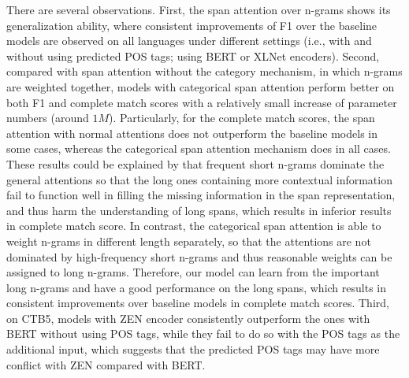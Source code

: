 \documentclass[11pt,a4paper]{article}
\begin{document}
There are several observations.
First, the span attention over n-grams shows its generalization ability, where 
consistent improvements of F1 over the baseline models are observed on all languages under different settings (i.e., with and without using predicted POS tags; using BERT or XLNet encoders).
Second, compared with span attention without the category mechanism, in which n-grams are weighted together, 
models with categorical span attention perform better on both F1 and complete match scores with a relatively small increase of parameter numbers (around $1M$).
Particularly, for the complete match scores, the span attention with normal attentions does not outperform the baseline models in some cases, whereas the categorical span attention mechanism does in all cases.
These results could be explained by that frequent short n-grams dominate the general attentions so that the long ones containing more contextual information fail to function well in filling the missing information in the span representation, and thus harm the understanding of long spans, which results in inferior results in complete match score.
In contrast, the categorical span attention is able to weight n-grams in different length separately, so that the attentions are not dominated by high-frequency short n-grams and thus reasonable weights can be assigned to long n-grams.
Therefore, our model can learn from the important long n-grams and have a good performance on the long spans, which results in consistent improvements over baseline models in complete match scores.
Third, on CTB5,
models with ZEN encoder consistently outperform the ones with BERT without using POS tags, while they fail to do so with the POS tags as the additional input, which suggests that the predicted POS tags may have more conflict with ZEN compared with BERT.
\end{document}
